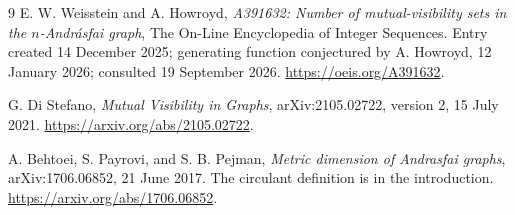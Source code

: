 \documentclass[11pt,a4paper]{article}
\theoremstyle{definition}
\begin{document}
\begin{thebibliography}{9}
E. W. Weisstein and A. Howroyd,
\emph{A391632: Number of mutual-visibility sets in the $n$-Andr\'asfai graph},
The On-Line Encyclopedia of Integer Sequences.
Entry created 14 December 2025; generating function conjectured by
A. Howroyd, 12 January 2026; consulted 19 September 2026.
\url{https://oeis.org/A391632}.

G. Di Stefano,
\emph{Mutual Visibility in Graphs},
arXiv:2105.02722, version 2, 15 July 2021.
\url{https://arxiv.org/abs/2105.02722}.

A. Behtoei, S. Payrovi, and S. B. Pejman,
\emph{Metric dimension of Andrasfai graphs},
arXiv:1706.06852, 21 June 2017.
The circulant definition is in the introduction.
\url{https://arxiv.org/abs/1706.06852}.
\end{thebibliography}
\end{document}
